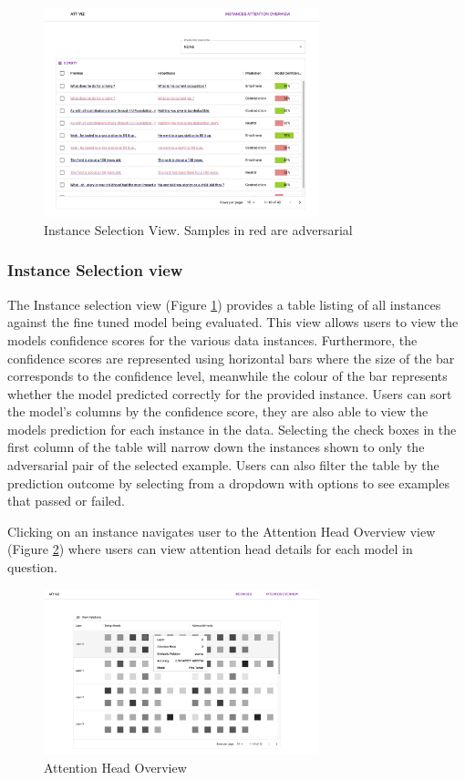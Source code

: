 \documentclass[journal]{vgtc}                %
\begin{document}
\begin{figure}[h]
    \centering
    
    \includegraphics[width=8cm]{figures/Instance_Selection_View.png}
    \caption{Instance Selection View. Samples in red are adversarial}
    \label{fig:instance_selection_view_visualization}
    
\end{figure}

\subsubsection{Instance Selection view} The Instance selection view (Figure \ref{fig:instance_selection_view_visualization}) provides a table listing of all instances against the fine tuned model being evaluated. This view allows users to view the models confidence scores for the various data instances. Furthermore, the confidence scores are represented using horizontal bars where the size of the bar corresponds to the confidence level, meanwhile the colour of the bar represents whether the model predicted correctly for the provided instance. Users can sort the model’s columns by the confidence score, they are also able to view the models prediction for each instance in the data. Selecting the check boxes in the first column of the table will narrow down the instances shown to only the adversarial pair of the selected example. Users can also filter the table by the prediction outcome by selecting from a dropdown with options to see examples that passed or failed. 

Clicking on an instance navigates user to the Attention Head Overview view (Figure \ref{fig:attention_head_overview_visualization}) where users can view attention head details for each model in question.

\begin{figure}[h]
    \centering
    
    \includegraphics[width=8cm]{figures/Attention_Head_Overview.png}
    \caption{Attention Head Overview}
    \label{fig:attention_head_overview_visualization}
    
\end{figure}
\end{document}
